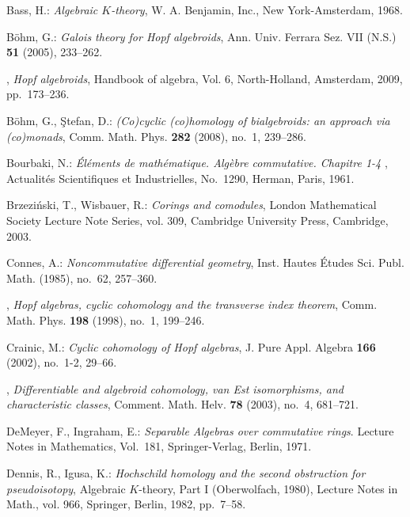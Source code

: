 \documentclass[reqno, a4paper, 10pt]{amsart}
\numberwithin{equation}{section}
\theoremstyle{plain}
\theoremstyle{definition}
\theoremstyle{remark}
\begin{document}
\begin{thebibliography}{10}

Bass, H.: \emph{Algebraic {$K$}-theory}, W. A. Benjamin, Inc., New
  York-Amsterdam, 1968.

B{\"o}hm, G.: \emph{Galois theory for {H}opf algebroids}, Ann. Univ. Ferrara Sez. 
VII (N.S.) \textbf{51} (2005), 233--262.

\bysame, \emph{Hopf algebroids}, Handbook of algebra, {V}ol. 6, North-Holland, Amsterdam,
  2009, pp.~173--236.

B{\"o}hm, G., {\c{S}}tefan, D.:
\emph{({C}o)cyclic (co)homology of bialgebroids: an approach via (co)monads}, Comm. Math. Phys.
  \textbf{282} (2008), no.~1, 239--286.

Bourbaki, N.: \emph{\'{E}l\'ements de math\'ematique. {A}lg\`ebre commutative.
  {C}hapitre 1-4}
, Actualit\'es   Scientifiques et Industrielles, No.~1290, Herman, Paris, 1961.

Brzezi{\'n}ski, T., Wisbauer, R.: \emph{Corings and comodules}, London
  Mathematical Society Lecture Note Series, vol. 309, Cambridge University
  Press, Cambridge, 2003.

Connes, A.: \emph{Noncommutative differential geometry}, Inst. Hautes \'Etudes
  Sci. Publ. Math. (1985), no.~62, 257--360.

\bysame, \emph{Hopf algebras, cyclic cohomology and the transverse index
  theorem}, Comm. Math. Phys. \textbf{198} (1998), no.~1, 199--246.

Crainic, M.: \emph{Cyclic cohomology of {H}opf algebras}, J. Pure Appl. Algebra
  \textbf{166} (2002), no.~1-2, 29--66.

\bysame, \emph{Differentiable and algebroid cohomology, van {E}st
  isomorphisms, and characteristic classes}, Comment. Math. Helv. \textbf{78}
  (2003), no.~4, 681--721.

DeMeyer, F., Ingraham, E.: \emph{Separable Algebras over commutative rings}.  Lecture Notes in Mathematics, Vol.~181, 
Springer-Verlag, Berlin, 1971.

Dennis, R., Igusa, K.: \emph{Hochschild homology and the second
  obstruction for pseudoisotopy},  Algebraic {$K$}-theory, {P}art {I}
  ({O}berwolfach, 1980),  Lecture Notes in Math., vol. 966, Springer, Berlin,
  1982, pp.~7--58.


\end{thebibliography}
\end{document}

